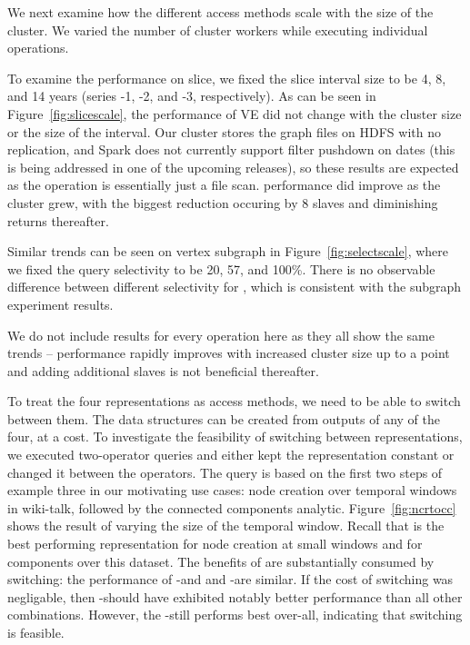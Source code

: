 We next examine how the different access methods scale with the size
of the cluster.  We varied the number of cluster workers while
executing individual operations.

To examine the performance on slice, we fixed the slice interval size
to be 4, 8, and 14 years (series -1, -2, and -3, respectively).  As
can be seen in Figure~\ref{fig:slicescale}, the performance of VE did
not change with the cluster size or the size of the interval.  Our
cluster stores the graph files on HDFS with no replication, and Spark
does not currently support filter pushdown on dates (this is being
addressed in one of the upcoming releases), so these results are
expected as the operation is essentially just a file scan.  \rg
performance did improve as the cluster grew, with the biggest
reduction occuring by 8 slaves and diminishing returns thereafter. 

Similar trends can be seen on vertex subgraph in
Figure~\ref{fig:selectscale}, where we fixed the query selectivity to
be 20, 57, and 100\%.  There is no observable difference between
different selectivity for \rg, which is consistent with the subgraph
experiment results.

We do not include results for every operation here as they all show
the same trends -- performance rapidly improves with increased cluster
size up to a point and adding additional slaves is not beneficial
thereafter.  


To treat the four representations as access methods, we need to be
able to switch between them.  The data structures can be created from
outputs of any of the four, at a cost.  To investigate the feasibility
of switching between representations, we executed two-operator queries
and either kept the representation constant or changed it between the
operators.  The query is based on the first two steps of example three
in our motivating use cases: node creation over temporal windows in
wiki-talk, followed by the connected components analytic.
Figure~\ref{fig:ncrtocc} shows the result of varying the size of the
temporal window.  Recall that \og is the best performing
representation for node creation at small windows and \hg for
components over this dataset.  The benefits of \hg are substantially
consumed by switching: the performance of \og-\og and and \og-\hg are
similar.  If the cost of switching was negligable, then \og-\hg should
have exhibited notably better performance than all other combinations.
However, the \og-\hg still performs best over-all, indicating that
switching is feasible.

